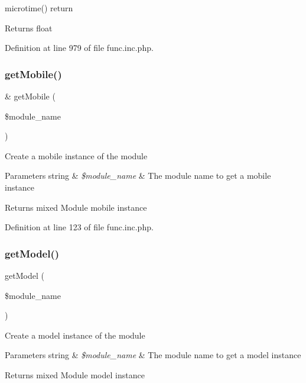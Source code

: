 microtime() return

\begin{DoxyReturn}{Returns}
float 
\end{DoxyReturn}


Definition at line 979 of file func.\+inc.\+php.

\hypertarget{func_8inc_8php_a26d3f423593da53eb90bb738aeed23ea}{}\label{func_8inc_8php_a26d3f423593da53eb90bb738aeed23ea} 
\subsubsection{\texorpdfstring{get\+Mobile()}{getMobile()}}
{\footnotesize\ttfamily \& get\+Mobile (\begin{DoxyParamCaption}\item[{}]{\$module\+\_\+name }\end{DoxyParamCaption})}

Create a mobile instance of the module


\begin{DoxyParams}[1]{Parameters}
string & {\em \$module\+\_\+name} & The module name to get a mobile instance \\
\hline
\end{DoxyParams}
\begin{DoxyReturn}{Returns}
mixed Module mobile instance 
\end{DoxyReturn}


Definition at line 123 of file func.\+inc.\+php.

\hypertarget{func_8inc_8php_aecdfcc5332bcf22df01fc21a03b64435}{}\label{func_8inc_8php_aecdfcc5332bcf22df01fc21a03b64435} 
\subsubsection{\texorpdfstring{get\+Model()}{getModel()}}
{\footnotesize\ttfamily get\+Model (\begin{DoxyParamCaption}\item[{}]{\$module\+\_\+name }\end{DoxyParamCaption})}

Create a model instance of the module


\begin{DoxyParams}[1]{Parameters}
string & {\em \$module\+\_\+name} & The module name to get a model instance \\
\hline
\end{DoxyParams}
\begin{DoxyReturn}{Returns}
mixed Module model instance 
\end{DoxyReturn}


